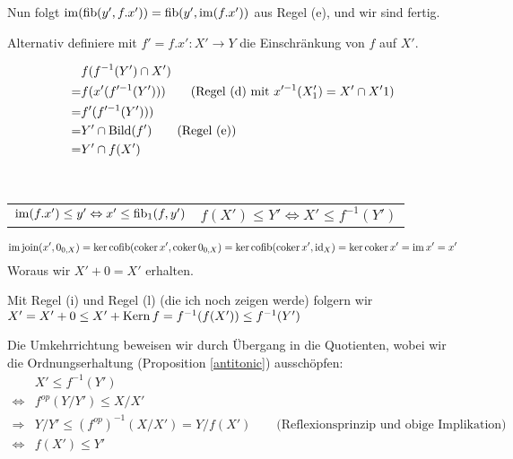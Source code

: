 \begin{bew}
Nun folgt $\operatorname{im}(\operatorname{fib}(y',f.x')) = \operatorname{fib}(y',\operatorname{im}(f.x'))$ aus Regel (e), und wir sind fertig.

Alternativ definiere mit $f' = f.x' : X' \to Y$ die Einschränkung von $f$ auf $X'$.

\begin{align*}
   & f(f^{-1}(Y')\cap X')
\\=& f(x'(f'^{-1}(Y'))) \qquad\text{(Regel (d) mit $x'^{-1}(X'_1) = X' \cap X'1$)}
\\=& f'(f'^{-1}(Y')))
\\=& Y' \cap \operatorname{Bild}(f') \qquad\text{(Regel (e))}
\\=& Y' \cap f(X')
\end{align*}
\end{bew}


\begin{lemm}[Regel (h)]
\ \linebreak

\begin{tabular}{ll}
$\operatorname{im}(f.x') \leq y' \Leftrightarrow x' \leq \operatorname{fib}_1(f,y')$
& $f(X') \leq Y' \Leftrightarrow X' \leq f^{-1}(Y')$
\end{tabular}
\end{lemm}
\begin{bew}
\[ \operatorname{im}\operatorname{join}(x',0_{0,X}) = \ker\operatorname{cofib}(\operatorname{coker} x', \operatorname{coker} 0_{0,X})
 = \ker\operatorname{cofib}(\operatorname{coker} x', \operatorname{id}_X) = \ker\operatorname{coker} x' = \operatorname{im} x' = x' \]
Woraus wir $X' + 0 = X'$ erhalten.

Mit Regel (i) und Regel (l) (die ich noch zeigen werde) folgern wir $X' = X' + 0 \leq X' + \operatorname{Kern} f = f^{-1}(f(X')) \leq f^{-1}(Y')$

Die Umkehrrichtung beweisen wir durch Übergang in die Quotienten, wobei wir
die Ordnungserhaltung (Proposition \ref{antitonic}) ausschöpfen:
\begin{align*}
                  & X' \leq f^{-1}(Y')
\\\Leftrightarrow & f^{op}(Y/Y') \leq X/X'
\\\Rightarrow     & Y/Y' \leq (f^{op})^{-1}(X/X') = Y/f(X') \qquad\text{(Reflexionsprinzip und obige Implikation)}
\\\Leftrightarrow & f(X') \leq Y'
\end{align*}
\end{bew}

